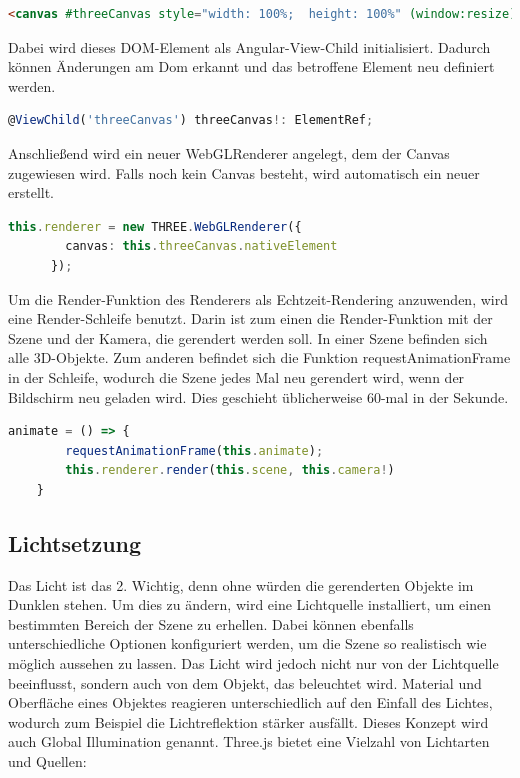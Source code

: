 \begin{lstlisting}[caption={Canvas-Element in HTML},language=HTML,label=lst:impl:canvas]
    <canvas #threeCanvas style="width: 100%;  height: 100%" (window:resize)="onResize($event)"></canvas>
\end{lstlisting}
Dabei wird dieses DOM-Element als Angular-View-Child initialisiert. Dadurch können Änderungen am Dom erkannt und das betroffene Element neu definiert werden. \cite{AngularViewChild}
\begin{lstlisting}[caption={Canvas als View-Child initialisieren},language=TypeScript,label=lst:impl:viewchild]
    @ViewChild('threeCanvas') threeCanvas!: ElementRef;
\end{lstlisting}
Anschließend wird ein neuer WebGLRenderer angelegt, dem der Canvas zugewiesen wird. Falls noch kein Canvas besteht, wird automatisch ein neuer erstellt. \cite{ThreejsWebGLRenderer}
\begin{lstlisting}[caption={WebGlRenderer anlegen},language=TypeScript,label=lst:impl:WebGlRenderer]
    this.renderer = new THREE.WebGLRenderer({
        canvas: this.threeCanvas.nativeElement
      });
\end{lstlisting}
Um die Render-Funktion des Renderers als Echtzeit-Rendering anzuwenden, wird eine Render-Schleife benutzt. Darin ist zum einen die Render-Funktion mit der Szene und der Kamera, die gerendert werden soll. In einer Szene befinden sich alle 3D-Objekte. Zum anderen befindet sich die Funktion requestAnimationFrame in der Schleife, wodurch die Szene jedes Mal neu gerendert wird, wenn der Bildschirm neu geladen wird. Dies geschieht üblicherweise 60-mal in der Sekunde. \cite{ThreejsCreateAScene}
\begin{lstlisting}[caption={Animations-Schleife},language=TypeScript,label=lst:impl:animationloop]
    animate = () => {
        requestAnimationFrame(this.animate);
        this.renderer.render(this.scene, this.camera!)
    }  
\end{lstlisting}

\subsection{Lichtsetzung}
\label{lichtsetzung}
Das Licht ist das 2. Wichtig, denn ohne würden die gerenderten Objekte im Dunklen stehen. Um dies zu ändern, wird eine Lichtquelle installiert, um einen bestimmten Bereich der Szene zu erhellen. Dabei können ebenfalls unterschiedliche Optionen konfiguriert werden, um die Szene so realistisch wie möglich aussehen zu lassen. Das Licht wird jedoch nicht nur von der Lichtquelle beeinflusst, sondern auch von dem Objekt, das beleuchtet wird. Material und Oberfläche eines Objektes reagieren unterschiedlich auf den Einfall des Lichtes, wodurch zum Beispiel die Lichtreflektion stärker ausfällt. Dieses Konzept wird auch Global Illumination genannt. Three.js bietet eine Vielzahl von Lichtarten und Quellen:

